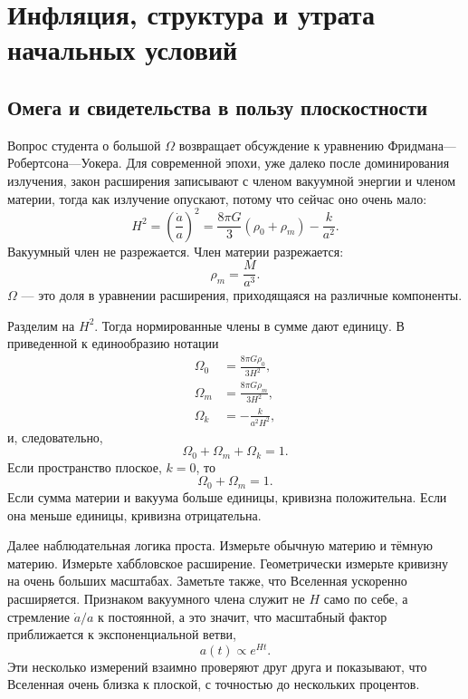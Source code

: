 \chapter{Инфляция, структура и утрата начальных условий}

\section{Омега и свидетельства в пользу плоскостности}

Вопрос студента о большой \(\Omega\) возвращает обсуждение к уравнению Фридмана—Робертсона—Уокера. Для современной эпохи, уже далеко после доминирования излучения, закон расширения записывают с членом вакуумной энергии и членом материи, тогда как излучение опускают, потому что сейчас оно очень мало:
\begin{equation}
H^2=\left(\frac{\dot a}{a}\right)^2=\frac{8\pi G}{3}\left(\rho_0+\rho_m\right)-\frac{k}{a^2}.
\end{equation}
Вакуумный член не разрежается. Член материи разрежается:
\begin{equation}
\rho_m=\frac{M}{a^3}.
\end{equation}
\(\Omega\) — это доля в уравнении расширения, приходящаяся на различные компоненты.

Разделим на \(H^2\). Тогда нормированные члены в сумме дают единицу. В приведенной к единообразию нотации
\begin{equation}
\begin{aligned}
\Omega_0&=\frac{8\pi G\rho_0}{3H^2},\\
\Omega_m&=\frac{8\pi G\rho_m}{3H^2},\\
\Omega_k&=-\frac{k}{a^2H^2},
\end{aligned}
\end{equation}
и, следовательно,
\begin{equation}
\Omega_0+\Omega_m+\Omega_k=1.
\end{equation}
Если пространство плоское, \(k=0\), то
\begin{equation}
\Omega_0+\Omega_m=1.
\end{equation}
Если сумма материи и вакуума больше единицы, кривизна положительна. Если она меньше единицы, кривизна отрицательна.

Далее наблюдательная логика проста. Измерьте обычную материю и тёмную материю. Измерьте хаббловское расширение. Геометрически измерьте кривизну на очень больших масштабах. Заметьте также, что Вселенная ускоренно расширяется. Признаком вакуумного члена служит не \(H\) само по себе, а стремление \(\dot a/a\) к постоянной, а это значит, что масштабный фактор приближается к экспоненциальной ветви,
\begin{equation}
a(t)\propto e^{Ht}.
\end{equation}
Эти несколько измерений взаимно проверяют друг друга и показывают, что Вселенная очень близка к плоской, с точностью до нескольких процентов.

